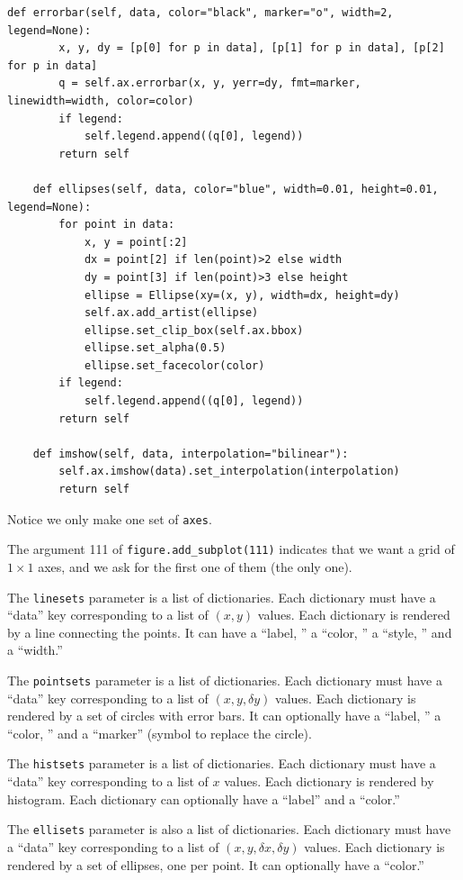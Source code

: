 \documentclass[justified, sixbynine]{tufte-book}
\def\ft{\small\tt}
\theoremstyle{plain}%
\newtheorem * {corollary}{Corollary}
\theoremstyle{definition}
\theoremstyle{remark}
\newtheorem * {remark}{Remark}
\newtheorem * {note}{Note}
\begin{document}
\begin{fullwidth}
\begin{lstlisting}[caption={in file: {\ft nlib.py}}]
    def errorbar(self, data, color="black", marker="o", width=2, legend=None):
        x, y, dy = [p[0] for p in data], [p[1] for p in data], [p[2] for p in data]
        q = self.ax.errorbar(x, y, yerr=dy, fmt=marker, linewidth=width, color=color)
        if legend:
            self.legend.append((q[0], legend))
        return self

    def ellipses(self, data, color="blue", width=0.01, height=0.01, legend=None):
        for point in data:
            x, y = point[:2]
            dx = point[2] if len(point)>2 else width
            dy = point[3] if len(point)>3 else height
            ellipse = Ellipse(xy=(x, y), width=dx, height=dy)
            self.ax.add_artist(ellipse)
            ellipse.set_clip_box(self.ax.bbox)
            ellipse.set_alpha(0.5)
            ellipse.set_facecolor(color)
        if legend:
            self.legend.append((q[0], legend))
        return self

    def imshow(self, data, interpolation="bilinear"):
        self.ax.imshow(data).set_interpolation(interpolation)
        return self
\end{lstlisting}

Notice we only make one set of {\ft axes}.

The argument 111 of {\ft figure.add\_subplot(111)} indicates that we want a grid of $1\times 1$ axes, and we ask for the first one of them (the only one).

The {\ft linesets} parameter is a list of dictionaries. Each dictionary must have a ``data'' key corresponding to a list of $(x, y)$ values. Each dictionary is rendered by a line connecting the points. It can have a ``label, '' a ``color, '' a ``style, '' and a ``width.''

The {\ft pointsets} parameter is a list of dictionaries. Each dictionary must have a ``data'' key corresponding to a list of $(x, y, \delta y)$ values. Each dictionary is rendered by a set of circles with error bars. It can optionally have a ``label, '' a ``color, '' and a ``marker'' (symbol to replace the circle).

The {\ft histsets} parameter is a list of dictionaries. Each dictionary must have a ``data'' key corresponding to a list of $x$ values. Each dictionary is rendered by histogram. Each dictionary can optionally have a ``label'' and a ``color.''

The {\ft ellisets} parameter is also a list of dictionaries. Each dictionary must have a ``data'' key corresponding to a list of $(x, y, \delta x, \delta y)$ values. Each dictionary is rendered by a set of ellipses, one per point. It can optionally have a ``color.''


\end{fullwidth}
\end{document}
